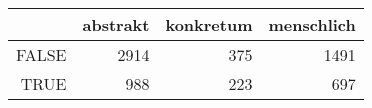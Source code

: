\begin{tabular}{rrrr}
  \hline
 & abstrakt & konkretum & menschlich \\ 
  \hline
FALSE & 2914 & 375 & 1491 \\ 
  TRUE & 988 & 223 & 697 \\ 
   \hline
\end{tabular}
